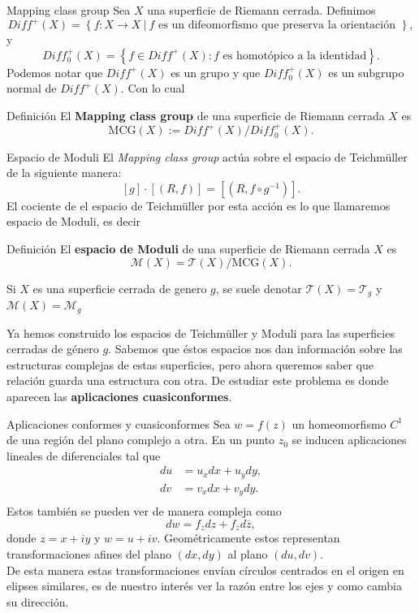\documentclass[xcolor=dvipsnames,10pt]{beamer}
\begin{document}
    \begin{frame}{Mapping class group}
        Sea $X$ una superficie de Riemann cerrada. Definimos
        $$Diff^+(X)=\left\{f:X\to X\ |\ f \text{ es un difeomorfismo que preserva la orientación }\right\},$$
        y
        $$Diff^+_0(X)=\left\{f\in Diff^+(X):f\text{ es homotópico a la identidad}\right\}.$$
        Podemos notar que $Diff^+(X)$ es un grupo y que $Diff^+_0(X)$ es un subgrupo normal de $Diff^+(X).$ Con lo cual 
        \begin{block}{Definición}
            El \textbf{Mapping class group} de una superficie de Riemann cerrada $X$ es
            $$\text{MCG}(X):=Diff^+(X)/Diff^+_0(X).$$
        \end{block}
        
    \end{frame}
    \begin{frame}{Espacio de Moduli}
        El \textit{Mapping class group} actúa sobre el espacio de Teichmüller de la siguiente manera:
        $$[g]\cdot[(R,f)]=[(R,f\circ g^{-1})].$$
        El cociente de el espacio de Teichmüller por esta acción es lo que llamaremos espacio de Moduli, es decir
        \begin{block}{Definición}
            El \textbf{espacio de Moduli} de una superficie de Riemann cerrada $X$ es
            $$\mathcal{M}(X)=\mathcal{T}(X)/\text{MCG}(X).$$
        \end{block}
        Si $X$ es una superficie cerrada de genero $g$, se suele denotar $\mathcal{T}(X)=\mathcal{T}_g$ y $\mathcal{M}(X)=\mathcal{M}_g$
    \end{frame}
    \begin{frame}
        Ya hemos construido los espacios de Teichmüller y Moduli para las superficies cerradas de género $g$. Sabemos que éstos espacios nos dan información sobre las estructuras complejas de estas superficies, pero ahora queremos saber que relación guarda una estructura con otra. De estudiar este problema es donde aparecen las \textbf{aplicaciones cuasiconformes}.
    \end{frame}

    

\begin{frame}{Aplicaciones conformes y cuasiconformes}
Sea $w=f(z)$ un homeomorfismo $C^1$ de una región del plano complejo a otra. En un punto $z_0$ se inducen aplicaciones lineales de diferenciales tal que\\
\begin{align*}
    du&=u_xdx+u_ydy,\\
    dv&=v_xdx+v_ydy.\\
\end{align*}
Estos también se pueden ver de manera compleja como
$$dw=f_zdz+f_{\overline{z}}d\overline{z},$$
donde $z=x+iy$ y $w=u+iv.$ Geométricamente  estos representan transformaciones afines del plano $(dx,dy)$ al plano
$(du,dv).$\\

De esta manera estas transformaciones envían círculos centrados en el origen en elipses similares, es de nuestro interés ver la razón entre los ejes y como cambia su dirección.    

\end{frame}
\end{document}
